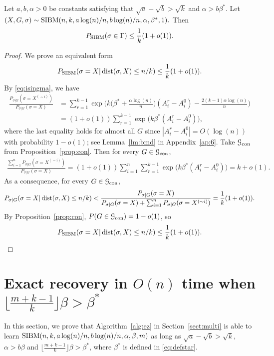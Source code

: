 \documentclass{article}
\begin{document}
\begin{proposition}  \label{prop:zj}
	Let $a,b,\alpha> 0$ be constants satisfying that $\sqrt{a}-\sqrt{b} > \sqrt{k}$ and $\alpha>b\beta^\ast$. Let 
	$
	(X,G,\sigma) \sim \operatorname{SIBM}(n,k, a\log(n)/n, b\log(n)/n,\alpha,\beta^\ast, 1) .
	$
	Then 
	$$
	P_{\operatorname{SIBM}}(\sigma \in \Gamma) \le \frac{1}{k}(1+o(1)) .
	$$
\end{proposition}
\begin{proof}
	We prove an equivalent form
	$$
	P_{\operatorname{SIBM}}(\sigma = X | \operatorname{dist}(\sigma, X) \le n/k) \le \frac{1}{k}(1+o(1)) .
	$$
	By \eqref{eq:isingma}, we have
	\begin{align*}
	\frac{P_{\sigma|G}(\sigma=X^{(\sim i)} )}
	{P_{\sigma|G}(\sigma=X)}
	& = \sum_{r=1}^{k-1}\exp\Big(k\big(\beta^\ast+\frac{\alpha\log(n)}{n} \big) (A^r_i-A^0_i)
	-\frac{2(k-1)\alpha\log(n)}{n} \Big) \\
	& = (1+o(1))\sum_{r=1}^{k-1} \exp\big(k\beta^\ast (A^r_i-A^0_i) \big)  ,
	\end{align*}
	where the last equality holds for almost all $G$ since $|A^r_i-A^0_i|=O(\log(n))$ with probability $1-o(1)$; see Lemma~\ref{lm:bmd} in Appendix~\ref{ap:6}.
	Take $\mathcal{G}_{\operatorname{con}}$ from Proposition~\ref{prop:con}. Then for every $G\in\mathcal{G}_{\operatorname{con}}$,
	\begin{align*}
	\frac{\sum_{i=1}^n P_{\sigma|G}(\sigma=X^{(\sim i)} )}
	{P_{\sigma|G}(\sigma=X)}  = (1+o(1)) \sum_{i=1}^n \sum_{r=1}^{k-1}\exp\big(k\beta^\ast (A^r_i-A^0_i) \big)  =k+o(1) .
	\end{align*}
	As a consequence, for every $G\in\mathcal{G}_{\operatorname{con}}$,
	\begin{align*}
	P_{\sigma|G} (\sigma= X | \operatorname{dist}(\sigma, X) \le n/k ) <
	\frac {P_{\sigma|G}(\sigma=X)}
	{P_{\sigma|G}(\sigma=X)+\sum_{i=1}^n P_{\sigma|G}(\sigma=X^{(\sim i)} )}
	=\frac{1}{k} (1+o(1)) .
	\end{align*}
	By Proposition~\ref{prop:con}, $P(G\in\mathcal{G}_{\operatorname{con}})=1-o(1)$, so
	$$
	P_{\operatorname{SIBM}}(\sigma= X | \operatorname{dist}(\sigma, X) \le n/k ) \le \frac{1}{k}(1+o(1)) .
	$$
\end{proof}
\section{Exact recovery in $O(n)$ time when $\lfloor \frac{m+k-1}{k} \rfloor \beta>\beta^\ast$}
\label{sect:direct}
In this section, we prove that Algorithm~\ref{alg:ez} in Section~\ref{sect:multi} is able to learn $\SIBM(n,k,a\log(n)/n, \linebreak[4] b\log(n)/n,\alpha,\beta, m)$ as long as $\sqrt{a}-\sqrt{b} > \sqrt{k}$,  $\alpha>b\beta$ and $\lfloor \frac{m+k-1}{k} \rfloor \beta>\beta^\ast$, where $\beta^\ast$ is defined in \eqref{eq:defstar}.
\end{document}
